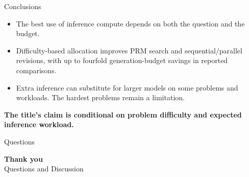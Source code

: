\documentclass[aspectratio=1610,xcolor=dvipsnames,t]{beamer}
\newcommand{\keyterm}[1]{\textcolor{unirot}{\textbf{#1}}}
\begin{document}
\begin{frame}{Conclusions}
  \begin{itemize}
    \item The best use of inference compute depends on both the question and the budget.
    \item Difficulty-based allocation improves PRM search and sequential/parallel revisions, with up to fourfold generation-budget savings in reported comparisons.
    \item Extra inference can substitute for larger models on some problems and workloads. The hardest problems remain a limitation.
  \end{itemize}
  \par\medskip
  \keyterm{The title's claim is conditional on problem difficulty and expected inference workload.}
\end{frame}

\begin{frame}{Questions}
  \vfill
  \begin{center}
    {\Huge\color{unirot}\textbf{Thank you}}\\[.4cm]
    {\Large Questions and Discussion}
  \end{center}
  \vfill
\end{frame}

\appendix
\end{document}
